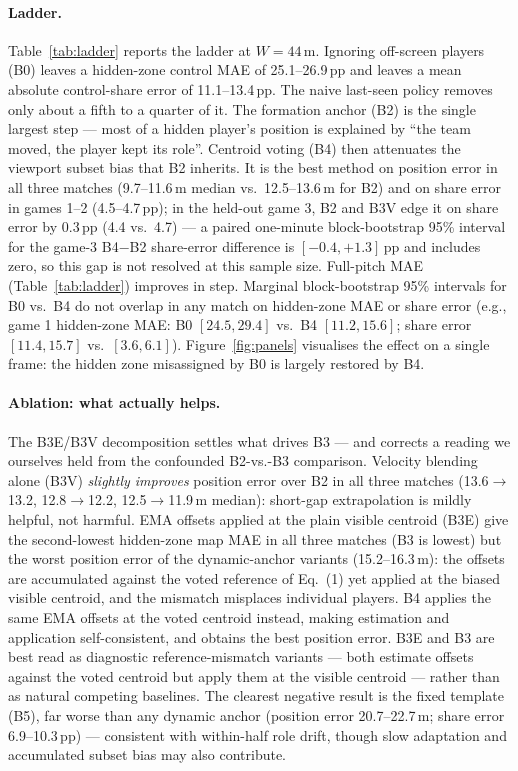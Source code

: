 \documentclass[11pt]{article}
\newcommand{\pp}{\,pp}   %
\begin{document}
\paragraph{Ladder.}
Table~\ref{tab:ladder} reports the ladder at $W = 44$\,m.
Ignoring off-screen players (B0) leaves a hidden-zone control MAE of
25.1--26.9\pp{} and leaves a mean absolute control-share error of 11.1--13.4\pp{}. The naive last-seen policy removes only about a fifth to a quarter of
it. The formation anchor (B2) is the single largest step --- most of a hidden
player's position is explained by ``the team moved, the player kept its
role''. Centroid voting (B4) then attenuates the viewport subset bias that B2
inherits. It is the best method on position error in all three matches
(9.7--11.6\,m median vs.\ 12.5--13.6\,m for B2) and on share error in games
1--2 (4.5--4.7\pp{}); in the held-out game 3, B2 and B3V edge it on share
error by 0.3\pp{} (4.4 vs.\ 4.7) --- a paired one-minute block-bootstrap
95\% interval for the game-3 B4$-$B2 share-error difference is
$[-0.4, +1.3]$\pp{} and includes zero, so this gap is not resolved at this
sample size. Full-pitch MAE
(Table~\ref{tab:ladder}) improves in step. Marginal block-bootstrap 95\%
intervals for B0 vs.\ B4 do not overlap in any match on hidden-zone MAE or
share error (e.g., game 1 hidden-zone MAE: B0 $[24.5, 29.4]$ vs.\ B4
$[11.2, 15.6]$; share error $[11.4, 15.7]$ vs.\ $[3.6, 6.1]$). Figure~\ref{fig:panels} visualises the effect on a single
frame: the hidden zone misassigned by B0 is largely restored by B4.

\paragraph{Ablation: what actually helps.}
The B3E/B3V decomposition settles what drives B3 --- and corrects a reading we
ourselves held from the confounded B2-vs.-B3 comparison. Velocity blending
alone (B3V) \emph{slightly improves} position error over B2 in all three
matches (13.6$\to$13.2, 12.8$\to$12.2, 12.5$\to$11.9\,m median): short-gap
extrapolation is mildly helpful, not harmful. EMA offsets applied at the plain
visible centroid (B3E) give the second-lowest hidden-zone map MAE in all three
matches (B3 is lowest) but the worst position error of the dynamic-anchor
variants (15.2--16.3\,m): the offsets are accumulated against the voted
reference of Eq.~(1) yet applied at the biased visible centroid, and the
mismatch misplaces individual players. B4 applies the same EMA offsets at the
voted centroid instead, making estimation and application self-consistent, and
obtains the best position error. B3E and B3 are best read as diagnostic
reference-mismatch variants --- both estimate offsets against the voted centroid
but apply them at the visible centroid --- rather than as natural competing
baselines. The clearest negative result is the fixed
template (B5), far worse than any dynamic anchor (position error
20.7--22.7\,m; share error 6.9--10.3\pp{}) --- consistent with within-half
role drift, though slow adaptation and accumulated subset bias may also
contribute.
\end{document}

